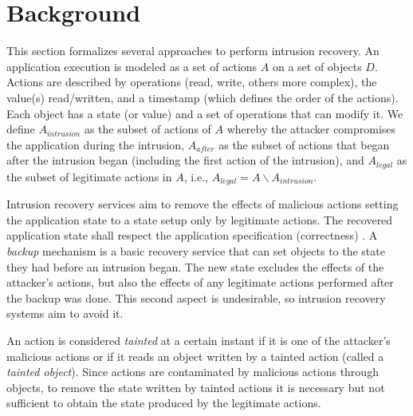 
\section{Background}\label{sec:background}

This section formalizes several approaches to perform intrusion recovery. %
%
An application execution is modeled as a set of actions $A$ on a set of objects $D$. Actions are described by operations (read, write, others more complex), the value(s) read/written, and a timestamp (which defines the order of the actions). Each object has a state (or value) and a set of operations that can modify it. We define $A_{intrusion}$ as the subset of actions of $A$ whereby the attacker compromises the application during the intrusion, $A_{after}$ as the subset of actions that began after the intrusion began (including the first action of the intrusion), and $A_{legal}$ as the subset of legitimate actions in $A$, i.e., $A_{legal} = A \backslash A_{intrusion}$.

Intrusion recovery services aim to remove the effects of malicious actions setting the application state to a state setup only by legitimate actions. The recovered application state shall respect the application specification (correctness) \cite{Aviz}.
%
A \textit{backup} mechanism is a basic recovery service that can set objects to the state they had before an intrusion began. The new state excludes the effects of the attacker's actions, but also the effects of any legitimate actions performed after the backup was done. This second aspect is undesirable, so intrusion recovery systems aim to avoid it.

An action is considered \textit{tainted} at a certain instant if it is one of the attacker's malicious actions or if it reads an object written by a tainted action (called a \textit{tainted object}). Since actions are contaminated by malicious actions through objects, to remove the state written by tainted actions it is necessary but not sufficient to obtain the state produced by the legitimate actions. 



